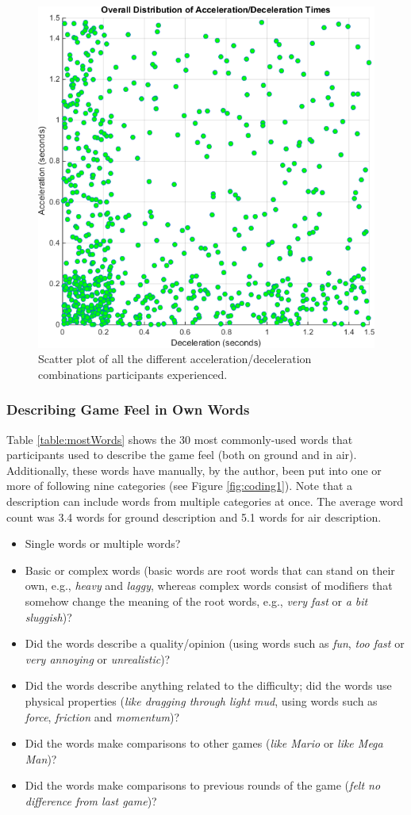\begin{figure}[htbp]
\centering
\includegraphics[width=0.7\columnwidth]{Pics/Classes/overall_distribution}
\caption{Scatter plot of all the different acceleration/deceleration combinations participants experienced.}
\label{fig:overallDistribution}
\end{figure}

\subsubsection{Describing Game Feel in Own Words}
Table \ref{table:mostWords} shows the 30 most commonly-used words that participants used to describe the game feel (both on ground and in air). Additionally, these words have manually, by the author, been put into one or more of following nine categories (see Figure \ref{fig:coding1}). Note that a description can include words from multiple categories at once. The average word count was 3.4 words for ground description and 5.1 words for air description.

\begin{itemize}[noitemsep,nolistsep]
\item Single words or multiple words?
\item Basic or complex words (basic words are root words that can stand on their own, e.g., \textit{heavy} and \textit{laggy}, whereas complex words consist of modifiers that somehow change the meaning of the root words, e.g., \textit{very fast} or \textit{a bit sluggish})?
\item Did the words describe a quality/opinion (using words such as \textit{fun}, \textit{too fast} or \textit{very annoying} or \textit{unrealistic})?
\item Did the words describe anything related to the difficulty; did the words use physical properties (\textit{like dragging through light mud}, using words such as \textit{force}, \textit{friction} and \textit{momentum})?
\item Did the words make comparisons to other games (\textit{like Mario} or \textit{like Mega Man})?
\item Did the words make comparisons to previous rounds of the game (\textit{felt no difference from last game})?
\end{itemize}

